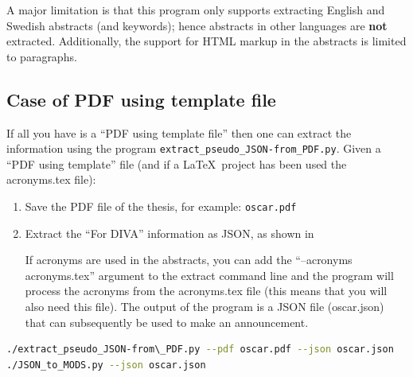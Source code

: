 A major limitation is that this program only supports extracting English and Swedish abstracts (and keywords); hence abstracts in other languages are \textbf{not} extracted. Additionally, the support for HTML markup in the abstracts is limited to paragraphs. 



\subsection{Case of PDF using template file}
\label{sec:extractingJSONPDF}
If all you have is a ``PDF using template file'' then one can extract the information using the program \texttt{extract\_pseudo\_JSON-from\_PDF.py}.  Given a ``PDF using template'' file (and if a \LaTeX~project has been used the acronyms.tex file):
\begin{enumerate}
    \item Save the PDF file of the thesis, for example: \texttt{oscar.pdf}
    \item Extract the “For DIVA” information as JSON, as shown in 
    
    If acronyms are used in the abstracts, you can add the “--acronyms acronyms.tex” argument to the extract command line and the program will process the acronyms from the acronyms.tex file (this means that you will also need this file). The output of the program is a JSON file (oscar.json) that can subsequently be used to make an announcement.
\end{enumerate}
\begin{lstlisting}[basicstyle=\footnotesize, language={bash}, caption={Commands to extract pseudo JSON from the PDF file for Oscar}, label=lst:AdminextractPseudoJSONFromPDFforOscarFileToJSON]    
./extract_pseudo_JSON-from\_PDF.py --pdf oscar.pdf --json oscar.json
./JSON_to_MODS.py --json oscar.json
\end{lstlisting}


